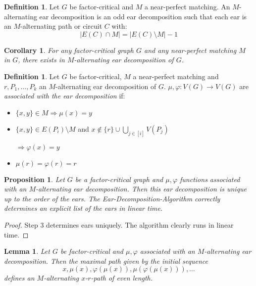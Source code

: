 \documentclass[11pt, a4paper]{article}
\newcommand{\abs}[1]{\left\lvert#1\right\rvert}
\newcommand{\set}[1]{\{#1\}}
\newtheorem{lemma}[theorem]{Lemma}
\newtheorem{cor}[theorem]{Corollary}
\newtheorem{prop}[theorem]{Proposition}
\theoremstyle{remark}
\theoremstyle{definition}
\newtheorem{definition}[theorem]{Definition}
\begin{document}
\begin{definition}
Let $G$ be factor-critical and $M$ a near-perfect matching.
An $M$-alternating ear decomposition is an odd ear decomposition
such that each ear is an $M$-alternating path or circuit $C$ with:
\[\abs{E(C)\cap M}=\abs{E(C)\setminus M}-1\]
\end{definition}

\begin{cor}
For any factor-critical graph $G$ and any near-perfect matching $M$ in $G$,
there exists in $M$-alternating ear decomposition of $G$.
\end{cor}

\begin{definition}
Let $G$ be factor-critical, $M$ a near-perfect matching and
$r,P_1,\ldots,P_k$ an $M$-alternating ear decomposition of $G$.
$\mu,\varphi: V(G)\to V(G)$ are \emph{associated with the ear
decomposition} if:
\begin{itemize}
	\item $\set{x,y}\in M\Rightarrow \mu(x)=y$
	\item $\set{x,y}\in E(P_i)\setminus M$ and $x\notin\set{r}
		\cup\bigcup_{j\in [i]}V(P_j)$

		$\Rightarrow \varphi(x)=y$
	\item $\mu(r)=\varphi(r)=r$
\end{itemize}
\end{definition}


\begin{prop}
Let $G$ be a factor-critical graph and $\mu,\varphi$ functions associated
with an $M$-alternating ear decomposition. Then this ear decomposition is
unique up to the order of the ears. The Ear-Decomposition-Algorithm
correctly determines an explicit list of the ears in linear time.
\end{prop}
\begin{proof}
Step 3 determines ears uniquely. The algorithm clearly runs in linear
time.
\end{proof}

\begin{lemma}
Let $G$ be factor-critical and $\mu,\varphi$ associated with an
$M$-alternating ear decomposition. Then the maximal path given by the
initial sequence
\begin{equation}\label{eq:ear-alt-path}
x,\mu(x),\varphi(\mu(x)),\mu(\varphi(\mu(x))),\ldots
\end{equation}
defines an $M$-alternating $x$-$r$-path of even length.
\end{lemma}
\end{document}

